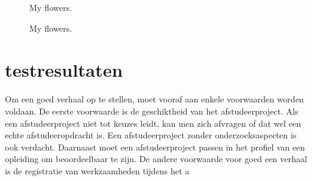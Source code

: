 			
			
			\begin{figure}[!ht]
				\centering
				\begin{floatrow}
					
				\end{floatrow}
			\end{figure}
			
			
			\begin{figure}[!tbp]
				\centering
				\hfill
				\caption{My flowers.}
				\hfill
				\caption{My flowers.}
			\end{figure}
			
			
			
			\section{testresultaten}
			Om een goed verhaal op te stellen, moet vooraf aan enkele voorwaarden
			worden voldaan. De eerste voorwaarde is de geschiktheid van het
			afstudeerproject. Als een afstudeerproject niet tot keuzes leidt, kan
			men zich afvragen of dat wel een echte afstudeeropdracht is. Een
			afstudeerproject zonder onderzoeksaspecten is ook verdacht. Daarnaast
			moet een afstudeerproject passen in het profiel van een opleiding om
			beoordeelbaar te zijn. De andere voorwaarde voor goed een verhaal is
			de registratie van werkzaamheden tijdens het a
			
